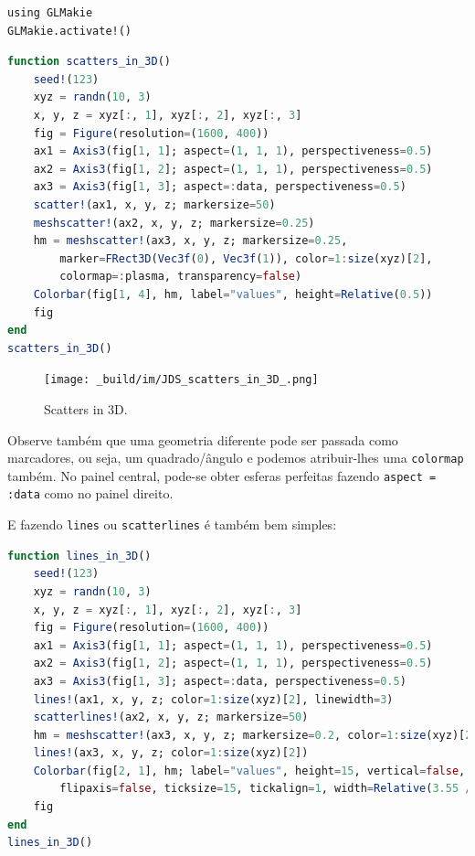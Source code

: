 \documentclass[
  notoc %
]{tufte-book}
\newcommand{\passthrough}[1]{#1}
\begin{document}
\begin{lstlisting}
using GLMakie
GLMakie.activate!()
\end{lstlisting}

\begin{lstlisting}[language=Julia]
function scatters_in_3D()
    seed!(123)
    xyz = randn(10, 3)
    x, y, z = xyz[:, 1], xyz[:, 2], xyz[:, 3]
    fig = Figure(resolution=(1600, 400))
    ax1 = Axis3(fig[1, 1]; aspect=(1, 1, 1), perspectiveness=0.5)
    ax2 = Axis3(fig[1, 2]; aspect=(1, 1, 1), perspectiveness=0.5)
    ax3 = Axis3(fig[1, 3]; aspect=:data, perspectiveness=0.5)
    scatter!(ax1, x, y, z; markersize=50)
    meshscatter!(ax2, x, y, z; markersize=0.25)
    hm = meshscatter!(ax3, x, y, z; markersize=0.25,
        marker=FRect3D(Vec3f(0), Vec3f(1)), color=1:size(xyz)[2],
        colormap=:plasma, transparency=false)
    Colorbar(fig[1, 4], hm, label="values", height=Relative(0.5))
    fig
end
scatters_in_3D()
\end{lstlisting}

\begin{figure}
\hypertarget{fig:scatters_in_3D}{%
\centering
\texttt{[image: \_build/im/JDS\_scatters\_in\_3D\_.png]}
\caption{Scatters in 3D.}\label{fig:scatters_in_3D}
}
\end{figure}

Observe também que uma geometria diferente pode ser passada como
marcadores, ou seja, um quadrado/ângulo e podemos atribuir-lhes uma
\passthrough{\lstinline!colormap!} também. No painel central, pode-se
obter esferas perfeitas fazendo \passthrough{\lstinline!aspect = :data!}
como no painel direito.

E fazendo \passthrough{\lstinline!lines!} ou
\passthrough{\lstinline!scatterlines!} é também bem simples:

\begin{lstlisting}[language=Julia]
function lines_in_3D()
    seed!(123)
    xyz = randn(10, 3)
    x, y, z = xyz[:, 1], xyz[:, 2], xyz[:, 3]
    fig = Figure(resolution=(1600, 400))
    ax1 = Axis3(fig[1, 1]; aspect=(1, 1, 1), perspectiveness=0.5)
    ax2 = Axis3(fig[1, 2]; aspect=(1, 1, 1), perspectiveness=0.5)
    ax3 = Axis3(fig[1, 3]; aspect=:data, perspectiveness=0.5)
    lines!(ax1, x, y, z; color=1:size(xyz)[2], linewidth=3)
    scatterlines!(ax2, x, y, z; markersize=50)
    hm = meshscatter!(ax3, x, y, z; markersize=0.2, color=1:size(xyz)[2])
    lines!(ax3, x, y, z; color=1:size(xyz)[2])
    Colorbar(fig[2, 1], hm; label="values", height=15, vertical=false,
        flipaxis=false, ticksize=15, tickalign=1, width=Relative(3.55 / 4))
    fig
end
lines_in_3D()
\end{lstlisting}
\end{document}
